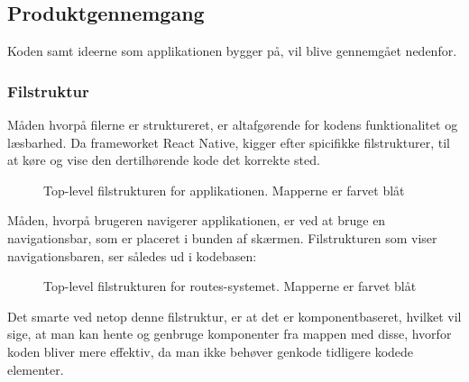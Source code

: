 \subsection{Produktgennemgang}
Koden samt ideerne som applikationen bygger på, vil blive gennemgået nedenfor.
\subsubsection{Filstruktur}

Måden hvorpå filerne er struktureret, er altafgørende for kodens funktionalitet og læsbarhed. Da frameworket React Native, kigger efter spicifikke filstrukturer, til at køre og vise den dertilhørende kode det korrekte sted.
\begin{figure}[H]
    \caption{Top-level filstrukturen for applikationen. Mapperne er farvet blåt}
    \label{fig:tlprojstruct}
\end{figure}

Måden, hvorpå brugeren navigerer applikationen, er ved at bruge en navigationsbar, som er placeret i bunden af skærmen. 
Filstrukturen som viser navigationsbaren, ser således ud i kodebasen:
\begin{figure}[H]
    \caption{Top-level filstrukturen for routes-systemet. Mapperne er farvet blåt}
    \label{fig:tlprojstruct}
\end{figure}

Det smarte ved netop denne filstruktur, er at det er komponentbaseret, hvilket vil sige, at man kan hente og genbruge komponenter fra mappen med disse, hvorfor koden bliver mere effektiv, da man ikke behøver genkode tidligere kodede elementer. 

